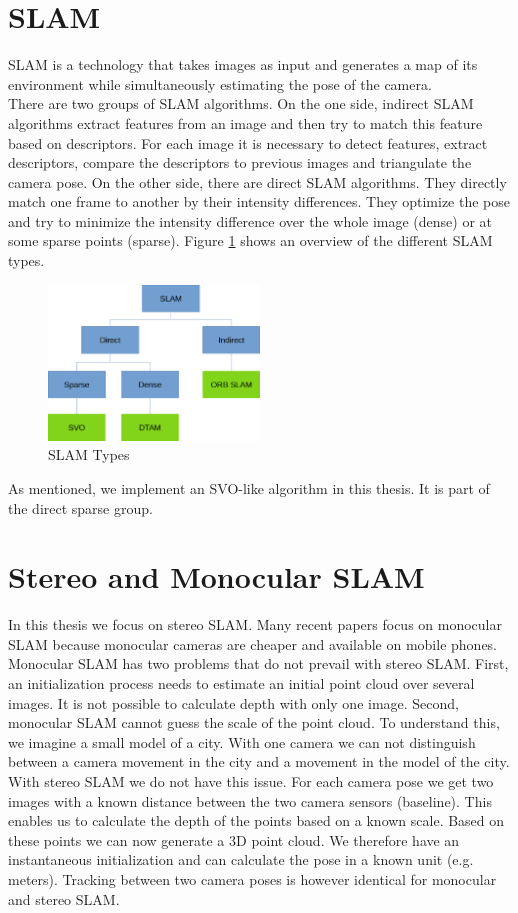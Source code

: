 \documentclass[11pt,a4paper,titlepage,oneside]{report}
\begin{document}
\section{SLAM}

SLAM is a technology that takes images as input and generates a map of its environment while simultaneously estimating the pose of the camera.\\
There are two groups of SLAM algorithms. On the one side, indirect SLAM algorithms extract features from an image and then try to match this feature based on descriptors. For each image it is necessary to detect features, extract descriptors, compare the descriptors to previous images and triangulate the camera pose. On the other side, there are direct SLAM algorithms. They directly match one frame to another by their intensity differences. They optimize the pose and try to minimize the intensity difference over the whole image (dense) or at some sparse points (sparse). Figure \ref{fig:slammodes} shows an overview of the different SLAM types.

\begin{figure}[H]
  \centering
  \includegraphics[width=0.5\textwidth]{img/slam_modes.png}
  \caption{SLAM Types}\label{fig:slammodes}
\end{figure}

As mentioned, we implement an SVO-like algorithm in this thesis. It is part of the direct sparse group.

\section{Stereo and Monocular SLAM}

In this thesis we focus on stereo SLAM. Many recent papers focus on monocular SLAM because monocular cameras are cheaper and available on mobile phones. Monocular SLAM has two problems that do not prevail with stereo SLAM. First, an initialization process needs to estimate an initial point cloud over several images. It is not possible to calculate depth with only one image. Second, monocular SLAM cannot guess the scale of the point cloud. To understand this, we imagine a small model of a city. With one camera we can not distinguish between a camera movement in the city and a movement in the model of the city. With stereo SLAM we do not have this issue. For each camera pose we get two images with a known distance between the two camera sensors (baseline). This enables us to calculate the depth of the points based on a known scale. Based on these points we can now generate a 3D point cloud. We therefore have an instantaneous initialization and can calculate the pose in a known unit (e.g. meters). Tracking between two camera poses is however identical for monocular and stereo SLAM.
\end{document}
